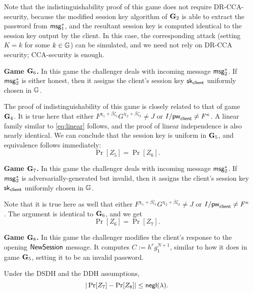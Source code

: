 Note that the indistinguishability proof of this game does not require DR-CCA-security, because the modified session key algorithm of $\mathbf{G}_2$ is able to extract the password from $\mathsf{msg}_{1}^{*}$, and the resultant session key is computed identical to the session key output by the client. In this case, the corresponding attack (setting $K = k$ for some $k\in\mathbb{G}$) can be simulated, and we need not rely on DR-CCA security; CCA-security is enough.

\textbf{Game $\mathbf{G}_6$.} In this game the challenger deals with incoming message $\mathsf{msg}_{2}^{*}$. If $\mathsf{msg}_{2}^{*}$ is either honest, then it assigns the client's session key $\mathsf{sk}_{\mathsf{client}}$ uniformly chosen in $\mathbb{G}$.

The proof of indistinguishability of this game is closely related to that of game $\mathbf{G}_4$. It is true here that either $F^{\chi_1+\beta\zeta_1}G^{\chi_2+\beta\zeta_2}\neq J$ or $I/\mathsf{pw}_{\mathsf{client}}\neq F^\kappa$. A linear family similar to \cref{eq:linear} follows, and the proof of linear independence is also nearly identical. We can conclude that the session key is uniform in $\mathbf{G}_5$, and equivalence follows immediately: $$\Pr[Z_5]=\Pr[Z_6].$$

\textbf{Game $\mathbf{G}_7$.} In this game the challenger deals with incoming message $\mathsf{msg}_{2}^{*}$. If $\mathsf{msg}_{2}^{*}$ is adversarially-generated but invalid, then it assigns the client's session key $\mathsf{sk}_{\mathsf{client}}$ uniformly chosen in $\mathbb{G}$.

Note that it is true here as well that either $F^{\chi_1+\beta\zeta_1}G^{\chi_2+\beta\zeta_2}\neq J$ or $I/\mathsf{pw}_{\mathsf{client}}\neq F^\kappa$. The argument is identical to $\mathbf{G}_6$, and we get $$\Pr[Z_6]=\Pr[Z_7].$$

\textbf{Game $\mathbf{G}_8$.} In this game the challenger modifies the client's response to the opening $\mathsf{NewSession}$ message. It computes $C:=h^{r}g_1^{N+1}$, similar to how it does in game $\mathbf{G}_5$, setting it to be an invalid password. 

\begin{lemma}
	Under the DSDH and the DDH assumptions, $$|\Pr[Z_7]-\Pr[Z_8]|\leq\mathsf{negl}(\lambda).$$
\end{lemma}

